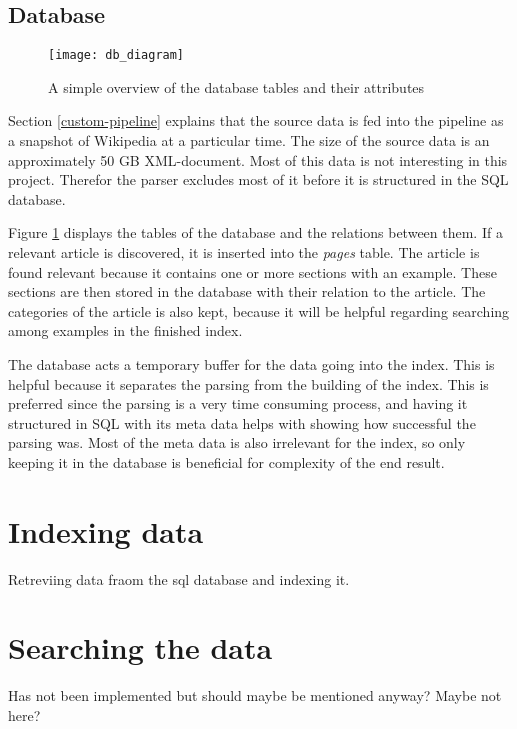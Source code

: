 \subsection{Database}

\begin{figure}[h] 
\caption{A simple overview of the database tables and their attributes}
\texttt{[image: db\_diagram]}
\label{fig:db_diagram}
\end{figure}


Section \ref{custom-pipeline} explains that the source data is fed into the pipeline as a snapshot of Wikipedia at a particular time. The size of the source data is an approximately 50 GB XML-document. Most of this data is not interesting in this project. Therefor the parser excludes most of it before it is structured in the SQL database. 

Figure \ref{fig:db_diagram} displays the tables of the database and the relations between them. If a relevant article is discovered, it is inserted into the \textit{pages} table. The article is found relevant because it contains one or more sections with an example. These sections are then stored in the database with their relation to the article. The categories of the article is also kept, because it will be helpful regarding searching among examples in the finished index.  

The database acts a temporary buffer for the data going into the index. This is helpful because it separates the parsing from the building of the index. This is preferred since the parsing is a very time consuming process, and having it structured in SQL with its meta data helps with showing how successful the parsing was. Most of the meta data is also irrelevant for the index, so only keeping it in the database is beneficial for complexity of the end result.


\section{Indexing data}

Retreviing data fraom the sql database and indexing it.

\section{Searching the data}

Has not been implemented but should maybe be mentioned anyway? Maybe not here?


\cleardoublepage